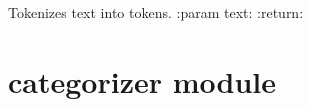 \documentclass[letterpaper,10pt,english]{sphinxmanual}
\begin{document}
\begin{fulllineitems}
\label{\detokenize{tokens:tokens.tokenizer}}
Tokenizes text into tokens.
:param text:
:return:

\end{fulllineitems}



\chapter{categorizer module}
\label{\detokenize{categorizer::doc}}\label{\detokenize{categorizer:categorizer-module}}\label{\detokenize{categorizer:module-categorizer}}
\end{document}
